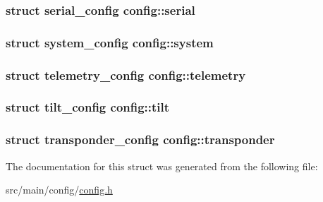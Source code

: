 \hypertarget{structconfig_aad524e924950bbcd340874b4771c1058}{
\subsubsection[{serial}]{\setlength{\rightskip}{0pt plus 5cm}struct {\bf serial\+\_\+config} config\+::serial}}\label{structconfig_aad524e924950bbcd340874b4771c1058}
\hypertarget{structconfig_af42bc80968b21cd9c440ea1b32bae7d4}{
\subsubsection[{system}]{\setlength{\rightskip}{0pt plus 5cm}struct {\bf system\+\_\+config} config\+::system}}\label{structconfig_af42bc80968b21cd9c440ea1b32bae7d4}
\hypertarget{structconfig_aafdae2411ca629aa312292e781a9b541}{
\subsubsection[{telemetry}]{\setlength{\rightskip}{0pt plus 5cm}struct {\bf telemetry\+\_\+config} config\+::telemetry}}\label{structconfig_aafdae2411ca629aa312292e781a9b541}
\hypertarget{structconfig_a1b2ed80eb598aa9dc8e769ed4f56fe0e}{
\subsubsection[{tilt}]{\setlength{\rightskip}{0pt plus 5cm}struct {\bf tilt\+\_\+config} config\+::tilt}}\label{structconfig_a1b2ed80eb598aa9dc8e769ed4f56fe0e}
\hypertarget{structconfig_a28f4898d7bd3c254a53d6c2cd93e0b71}{
\subsubsection[{transponder}]{\setlength{\rightskip}{0pt plus 5cm}struct {\bf transponder\+\_\+config} config\+::transponder}}\label{structconfig_a28f4898d7bd3c254a53d6c2cd93e0b71}


The documentation for this struct was generated from the following file\+:\begin{DoxyCompactItemize}
\item 
src/main/config/\hyperlink{config_8h}{config.\+h}\end{DoxyCompactItemize}
